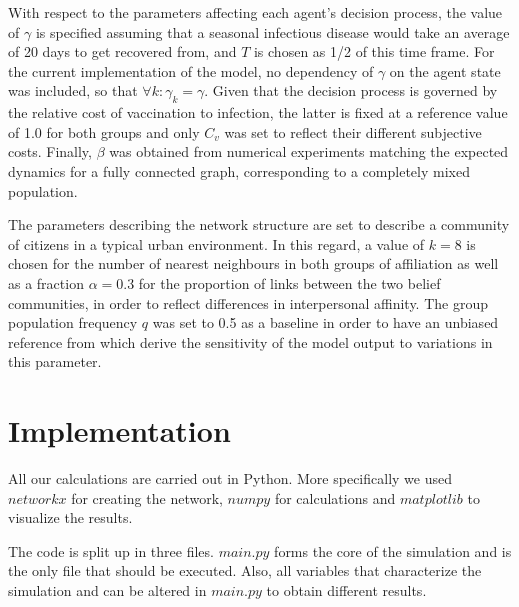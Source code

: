 \documentclass[11pt]{article}
\begin{document}
With respect to the parameters affecting each agent's decision process, the value of \(\gamma\) is specified assuming that a seasonal infectious disease would take an average of 20 days to get recovered from, and \(T\) is chosen as 1/2 of this time frame. For the current implementation of the model, no dependency of \(\gamma\) on the agent state was included, so that \(\forall k : \gamma_{k} = \gamma\). Given that the decision process is governed by the relative cost of vaccination to infection, the latter is fixed at a reference value of 1.0 for both groups and only \(C_v\) was set to reflect their different subjective costs. Finally, \(\beta\) was obtained from numerical experiments matching the expected dynamics for a fully connected graph, corresponding to a completely mixed population.

The parameters describing the network structure are set to describe a community of citizens in a typical urban environment. In this regard, a value of \(k = 8\) is chosen for the number of nearest neighbours in both groups of affiliation as well as a fraction \(\alpha = 0.3\) for the proportion of links between the two belief communities, in order to reflect differences in interpersonal affinity. The group population frequency \(q\) was set to 0.5 as a baseline in order to have an unbiased reference from which derive the sensitivity of the model output to variations in this parameter.



\section{Implementation}

All our calculations are carried out in Python. More specifically we used $networkx$ for creating the network, $numpy$ for calculations and $matplotlib$ to visualize the results.

The code is split up in three files. $main.py$ forms the core of the simulation and is the only file that should be executed. Also, all variables that characterize the simulation and can be altered in $main.py$ to obtain different results.
\end{document}
